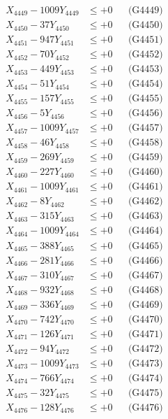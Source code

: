 \documentclass[a4paper,10pt]{article}
\begin{document}
{\begin{align}
X_{4449} - 1009Y_{4449} &\leq +0 && \text{(G4449)} \\
X_{4450} - 37Y_{4450} &\leq +0 && \text{(G4450)} \\
\allowbreak
X_{4451} - 947Y_{4451} &\leq +0 && \text{(G4451)} \\
X_{4452} - 70Y_{4452} &\leq +0 && \text{(G4452)} \\
X_{4453} - 449Y_{4453} &\leq +0 && \text{(G4453)} \\
X_{4454} - 51Y_{4454} &\leq +0 && \text{(G4454)} \\
X_{4455} - 157Y_{4455} &\leq +0 && \text{(G4455)} \\
X_{4456} - 5Y_{4456} &\leq +0 && \text{(G4456)} \\
X_{4457} - 1009Y_{4457} &\leq +0 && \text{(G4457)} \\
X_{4458} - 46Y_{4458} &\leq +0 && \text{(G4458)} \\
X_{4459} - 269Y_{4459} &\leq +0 && \text{(G4459)} \\
X_{4460} - 227Y_{4460} &\leq +0 && \text{(G4460)} \\
\allowbreak
X_{4461} - 1009Y_{4461} &\leq +0 && \text{(G4461)} \\
X_{4462} - 8Y_{4462} &\leq +0 && \text{(G4462)} \\
X_{4463} - 315Y_{4463} &\leq +0 && \text{(G4463)} \\
X_{4464} - 1009Y_{4464} &\leq +0 && \text{(G4464)} \\
X_{4465} - 388Y_{4465} &\leq +0 && \text{(G4465)} \\
X_{4466} - 281Y_{4466} &\leq +0 && \text{(G4466)} \\
X_{4467} - 310Y_{4467} &\leq +0 && \text{(G4467)} \\
X_{4468} - 932Y_{4468} &\leq +0 && \text{(G4468)} \\
X_{4469} - 336Y_{4469} &\leq +0 && \text{(G4469)} \\
X_{4470} - 742Y_{4470} &\leq +0 && \text{(G4470)} \\
\allowbreak
X_{4471} - 126Y_{4471} &\leq +0 && \text{(G4471)} \\
X_{4472} - 94Y_{4472} &\leq +0 && \text{(G4472)} \\
X_{4473} - 1009Y_{4473} &\leq +0 && \text{(G4473)} \\
X_{4474} - 766Y_{4474} &\leq +0 && \text{(G4474)} \\
X_{4475} - 32Y_{4475} &\leq +0 && \text{(G4475)} \\
X_{4476} - 128Y_{4476} &\leq +0 && \text{(G4476)} \\

\end{align}}
\end{document}
